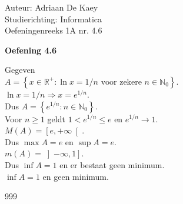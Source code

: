 \documentclass[a4paper]{article}
\begin{document}
\noindent \large Auteur: Adriaan De Kaey \\
\noindent \large Studierichting: Informatica\\
\noindent \large Oefeningenreeks 1A nr. 4.6\\

\medskip

\normalsize

\textbf{Oefening 4.6}

Gegeven\\

$A=\left\{x\in\mathbb{R}^+ : \ln x = 1/n \text{ voor zekere }n\in\mathbb{N}_0\right\}$.\\

$\ln x = 1/n \Rightarrow x = e^{1/n}$.\\

Dus $A=\left\{e^{1/n} : n\in\mathbb{N}_0\right\}$.\\

Voor $n\ge 1$ geldt $1<e^{1/n}\le e$ en $e^{1/n}\to 1$.\\

$M\left(A\right)=\left[e,+\infty\right[$.\\

Dus $\max A = e$ en $\sup A = e$.\\

$m\left(A\right)=\left]-\infty,1\right]$.\\

Dus $\inf A = 1$ en er bestaat geen minimum.\\

$\inf A = 1$ en geen minimum.\\

\begin{thebibliography}{999}
\end{thebibliography}
\end{document}
